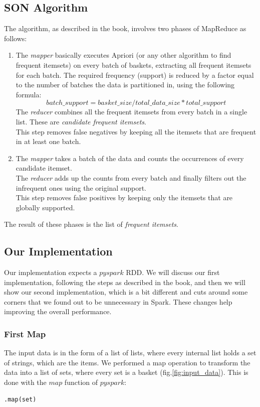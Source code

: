 \documentclass[a4paper]{article}
\begin{document}
	\subsection{SON Algorithm}	
	The algorithm, as described in the book, involves two phases of MapReduce as follows:
	\begin{enumerate}
	\item The \textit{mapper} basically executes Apriori (or any other algorithm to find frequent itemsets) on every batch of baskets, extracting all frequent itemsets for each batch. The required frequency (support) is reduced by a factor equal to the number of batches the data is partitioned in, using the following formula:
	\[ batch\_support = basket\_size / total\_data\_size * total\_support \]
	The \textit{reducer} combines all the frequent itemsets from every batch in a single list. These are \textit{candidate frequent itemsets}.\\
	This step removes false negatives by keeping all the itemsets that are frequent in at least one batch.
	\item The \textit{mapper} takes a batch of the data and counts the occurrences of every candidate itemset.\\
	The \textit{reducer} adds up the counts from every batch and finally filters out the infrequent ones using the original support.\\
	This step removes false positives by keeping only the itemsets that are globally supported.
	\end{enumerate}
	The result of these phases is the list of \textit{frequent itemsets}.
	
	\subsection{Our Implementation}
	Our implementation expects a $pyspark$ RDD. We will discuss our first implementation, following the steps as described in the book, and then we will show our second implementation, 
	which is a bit different and cuts around some corners that we found out to be unnecessary in Spark. These changes help improving the overall performance.
	
	\subsubsection{First Map}
	The input data is in the form of a list of lists, where every internal list holds a set of strings, which are the items.
	We performed a map operation to transform the data into a list of sets, where every set is a basket (fig.\ref{fig:input_data}). 
	This is done with the $map$ function of $pyspark$:
	\begin{lstlisting}
.map(set)
\end{lstlisting}
	
\end{document}
